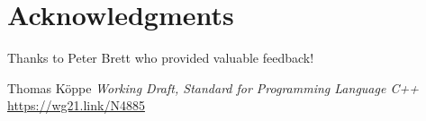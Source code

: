 \documentclass{wg21}
\begin{document}
\section{Acknowledgments}

Thanks to Peter Brett who provided valuable feedback!





\renewcommand{\section}[2]{}%
\begin{thebibliography}{9}

Thomas Köppe
\emph{Working Draft, Standard for Programming Language C++}\newline
\url{https://wg21.link/N4885}

\end{thebibliography}
\end{document}
